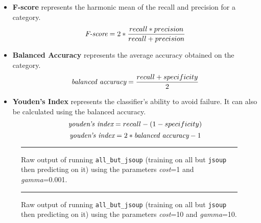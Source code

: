 \begin{itemize}
  \item \textbf{F-score} represents the harmonic mean of the recall and precision for a category.~\cite{SJS06}
  \begin{equation}
    \emph{$\text{F-score} = 2*\frac{recall * precision}{recall + precision}$}
    \label{equ:f_score}
  \end{equation}

  \item \textbf{Balanced Accuracy} represents the average accuracy obtained on the category.~\cite{BOSB10, SJS06}
  \begin{equation}
    \emph{$\text{balanced accuracy} = \frac{recall + specificity}{2}$}
    \label{equ:balanced_area_under_curve}
  \end{equation}

  \item \textbf{Youden's Index} represents the classifier's ability to avoid failure. It can also be calculated using the balanced accuracy.~\cite{SJS06}
  \begin{equation}
    \emph{$\text{youden's index} = recall - ( 1 - specificity)$}
    \label{equ:youden_index_a}
  \end{equation}
  \begin{equation}
    \emph{$\text{youden's index} = 2 * \text{balanced accuracy} - 1$}
    \label{equ:youden_index_b}
  \end{equation}
\end{itemize}

\begin{landscape}
  \begin{figure}
    \centering
    \begin{minipage}{22.0cm}
    \scriptsize{
    
    }
    \end{minipage}
    \caption{Raw output of running \texttt{all\_but\_jsoup} (training on all but \texttt{jsoup} then predicting on it) using the parameters \emph{cost}=1 and \emph{gamma}=0.001.}
    \vspace{2mm}
    \hrule
    \label{fig:raw_output_bad}
  \end{figure}

  \begin{figure}
    \centering
    \begin{minipage}{22.0cm}
    \scriptsize{
    
    }
    \end{minipage}
    \caption{Raw output of running \texttt{all\_but\_jsoup} (training on all but \texttt{jsoup} then predicting on it) using the parameters \emph{cost}=10 and \emph{gamma}=10.}
    \vspace{2mm}
    \hrule
    \label{fig:raw_output_good}
  \end{figure}
\end{landscape}


